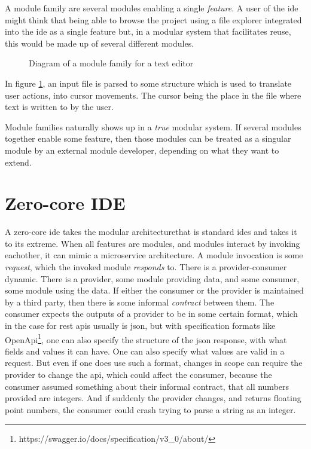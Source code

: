 A module family are several modules enabling a single
\textit{feature}. A user of the \gls*{ide} might think that being able to browse
the project using a file explorer integrated into the \gls*{ide} as a single
feature but, in a modular system that facilitates reuse, this would be made up
of several different modules.

\begin{figure}[H]
  \centering
  
  \caption{Diagram of a module family for a text editor}
  \label{fig:textEditorSimple}
\end{figure}

In figure \ref{fig:textEditorSimple}, an input file is parsed to some structure
which is used to translate user actions, into cursor movements. The cursor being
the place in the file where text is written to by the user.

Module families naturally shows up in a \textit{true} modular system. If
several modules together enable some feature, then those modules can be treated
as a singular module by an external module developer, depending on what they
want to extend.


\section{Zero-core IDE}

A zero-core \gls*{ide} takes the modular architecturethat is standard \gls*{ide}s
and takes it to its extreme. When all features are modules, and modules interact
by invoking eachother, it can mimic a microservice architecture. A module
invocation is some \textit{request}, which the invoked module \textit{responds}
to. There is a provider-consumer dynamic. There is a provider, some module
providing data, and some consumer, some module using the data. If either the
consumer or the provider is maintained by a third party, then there is some
informal \textit{contract} between them. The consumer expects the outputs of a
provider to be in some certain format, which in the case for \gls*{rest}
\gls*{api}s usually is \gls*{json}, but with specification formats like OpenApi\footnote{https://swagger.io/docs/specification/v3\_0/about/},
one can also specify the structure of the \gls*{json} response, with what fields
and values it can have. One can also specify what values are valid in a request.
But even if one does use such a format, changes in scope can require the
provider to change the \gls*{api}, which could affect the consumer, because the
consumer assumed something about their informal contract, that all numbers
provided are integers. And if suddenly the provider changes, and returns
floating point numbers, the consumer could crash trying to parse a string as an
integer.

